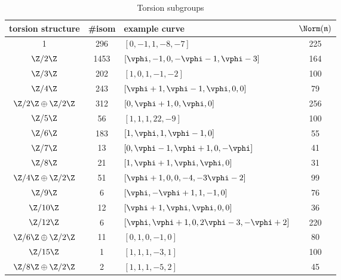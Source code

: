 \documentclass{amsart}
\newcommand{\n}{\mathfrak{n}}
\begin{document}
\begin{center}
\begin{table}[h]
\caption{Torsion subgroups\label{table:torsion}}
\begin{tabular}{|c|c|l|c|}\hline
\textbf{torsion structure} & \textbf{\#isom} & \textbf{example curve} & $\Norm(\n)$ \\\hline
1                    & 296  & $[0,-1,1,-8,-7]$                      & 225 \\\hline
$\Z/2\Z$             & 1453 & $[\vphi,-1,0,-\vphi-1,\vphi-3]$       & 164 \\\hline
$\Z/3\Z$             & 202  & $[1,0,1,-1,-2]$                       & 100 \\\hline
$\Z/4\Z$             & 243  & $[\vphi+1,\vphi-1,\vphi,0,0]$         & 79  \\\hline
$\Z/2\Z\oplus\Z/2\Z$ & 312  & $[0,\vphi+1,0,\vphi,0]$               & 256 \\\hline
$\Z/5\Z$             & 56   & $[1,1,1,22,-9]$                       & 100 \\\hline
$\Z/6\Z$             & 183  & $[1,\vphi,1,\vphi-1,0]$               & 55  \\\hline
$\Z/7\Z$             & 13   & $[0,\vphi-1,\vphi+1,0,-\vphi]$        & 41  \\\hline
$\Z/8\Z$             & 21   & $[1,\vphi+1,\vphi,\vphi,0]$           & 31  \\\hline
$\Z/4\Z\oplus\Z/2\Z$ & 51   & $[\vphi+1,0,0,-4,-3\vphi-2]$          & 99  \\\hline
$\Z/9\Z$             & 6    & $[\vphi,-\vphi+1,1,-1,0]$             & 76  \\\hline
$\Z/10\Z$            & 12   & $[\vphi+1,\vphi,\vphi,0,0]$           & 36  \\\hline
$\Z/12\Z$            & 6    & $[\vphi,\vphi+1,0,2\vphi-3,-\vphi+2]$ & 220 \\\hline
$\Z/6\Z\oplus\Z/2\Z$ & 11   & $[0,1,0,-1,0]$                        & 80  \\\hline
$\Z/15\Z$            & 1    & $[1,1,1,-3,1]$                        & 100 \\\hline
$\Z/8\Z\oplus\Z/2\Z$ & 2    & $[1,1,1,-5,2]$                        & 45  \\\hline
\end{tabular}
\end{table}
\end{center}
\end{document}
